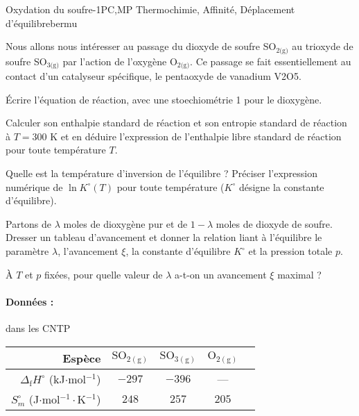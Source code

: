 \begin{exercise}{Oxydation du soufre}{-1}{PC,MP}
{Thermochimie, Affinité, Déplacement d'équilibre}{bermu}

    Nous allons nous intéresser au passage du dioxyde de soufre SO$_{2 \text{(g)}}$ au trioxyde de soufre SO$_{3 \text{(g)}}$ par l'action de l'oxygène O$_{2 \text{(g)}}$. Ce passage se fait essentiellement au contact d’un catalyseur spécifique, le pentaoxyde de vanadium V2O5.

\begin{questions}
    \question \'Ecrire l'équation de réaction, avec une stoechiométrie 1 pour le dioxygène.
    
    \question Calculer son enthalpie standard de réaction et son entropie standard de réaction à $T = 300$ K et en déduire l'expression de l’enthalpie libre standard de réaction pour toute température $T$.
    
    \question Quelle est la température d’inversion de l’équilibre ? Préciser l’expression numérique de $\ln K^\circ(T)$ pour toute température ($K^\circ$ désigne la constante d’équilibre).
    

    \question Partons de $\lambda$ moles de dioxygène pur et de $1 - \lambda$ moles de dioxyde de soufre. Dresser un tableau d’avancement et donner la relation liant à l’équilibre le paramètre $\lambda$, l’avancement $\xi$, la constante d’équilibre $K^\circ$ et la pression totale $p$.
    
    \question À $T$ et $p$ fixées, pour quelle valeur de $\lambda$ a-t-on un avancement $\xi$ maximal ?
    
    \paragraph{Données :} dans les CNTP
    \begin{center}
\begin{table}[H]
    \qquad\begin{tabular}{r|cccc}
        Espèce & $\mathrm{SO_{2 (g)}}$ & $\mathrm{SO_{3 (g)}}$ & $\mathrm{O_{2 (g)}}$ \\ \hline\hline
        $\Delta_\text{f}H^\circ$ (kJ$\cdot$mol$^{-1}$) & $-297$ & $-396$ & --- \\
        $S_m^\circ$ (J$\cdot$mol$^{-1}\cdot$K$^{-1}$) & $248$ & $257$ & $205$ \\ \hline
    \end{tabular}
\end{table}
    \end{center}
\end{questions}

\end{exercise}
